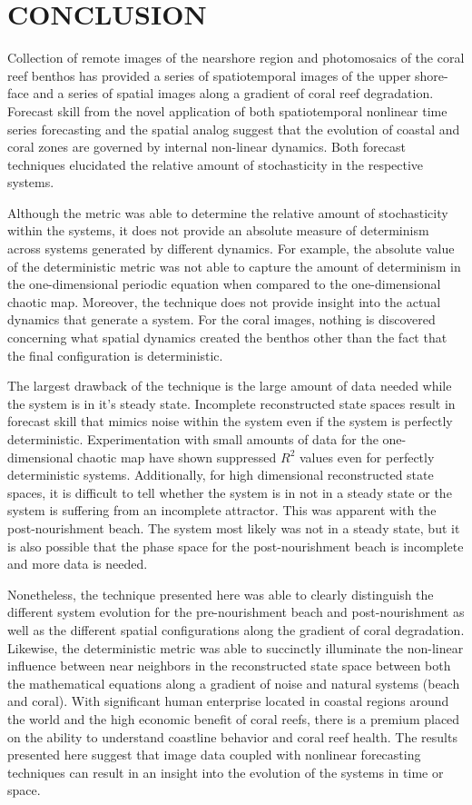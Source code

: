 \newpage


\section{CONCLUSION}

Collection of remote images of the nearshore region and photomosaics of the coral reef benthos has provided a series of spatiotemporal images of the upper shore-face and a series of spatial images along a gradient of coral reef degradation. Forecast skill from the novel application of both spatiotemporal nonlinear time series forecasting and the spatial analog suggest that the evolution of coastal and coral zones are governed by internal non-linear dynamics. Both forecast techniques elucidated the relative amount of stochasticity in the respective systems.

Although the metric was able to determine the relative amount of stochasticity within the systems, it does not provide an absolute measure of determinism across systems generated by different dynamics. For example, the absolute value of the deterministic metric was not able to capture the amount of determinism in the one-dimensional periodic equation when compared to the one-dimensional chaotic map. Moreover, the technique does not provide insight into the actual dynamics that generate a system. For the coral images, nothing is discovered concerning what spatial dynamics created the benthos other than the fact that the final configuration is deterministic.

The largest drawback of the technique is the large amount of data needed while the system is in it's steady state. Incomplete reconstructed state spaces result in forecast skill that mimics noise within the system even if the system is perfectly deterministic. Experimentation with small amounts of data for the one-dimensional chaotic map have shown suppressed $R^2$ values even for perfectly deterministic systems. Additionally, for high dimensional reconstructed state spaces, it is difficult to tell whether the system is in not in a steady state or the system is suffering from an incomplete attractor. This was apparent with the post-nourishment beach. The system most likely was not in a steady state, but it is also possible that the phase space for the post-nourishment beach is incomplete and more data is needed.

Nonetheless, the technique presented here was able to clearly distinguish the different system evolution for the pre-nourishment beach and post-nourishment as well as the different spatial configurations along the gradient of coral degradation. Likewise, the deterministic metric was able to succinctly illuminate the non-linear influence between near neighbors in the reconstructed state space between both the mathematical equations along a gradient of noise and natural systems (beach and coral). With significant human enterprise located in coastal regions around the world and the high economic benefit of coral reefs, there is a premium placed on the ability to understand coastline behavior and coral reef health. The results presented here suggest that image data coupled with nonlinear forecasting techniques can result in an insight into the evolution of the systems in time or space.

